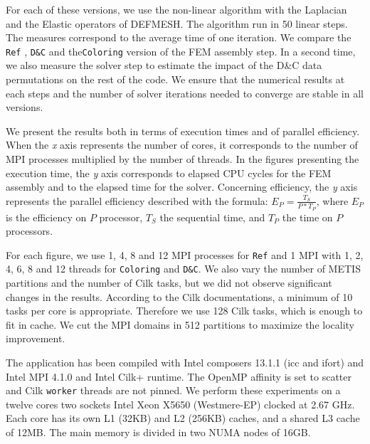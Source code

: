 \documentclass[10pt]{IOS-Book-Article}
\begin{document}
For each of these versions, we use the non-linear algorithm with the Laplacian and the Elastic operators of DEFMESH.
The algorithm run in 50 linear steps.
The measures correspond to the average time of one iteration.
We compare the  {\tt Ref} , {\tt D\&C} and the{\tt Coloring} version of the FEM assembly step.
In a second time, we also measure the solver step to estimate the impact of the D\&C data permutations on the rest of the code.
We ensure that the numerical results at each steps and the number of solver iterations needed to converge are stable in all versions.

We present the results both in terms of execution times and of parallel efficiency.
When the \emph{x} axis represents the number of cores, it corresponds to the number of MPI processes multiplied by the number of threads.
In the figures presenting the execution time, the \emph{y} axis corresponds to elapsed CPU cycles for the FEM assembly and to the elapsed time for the solver.
Concerning efficiency, the \emph{y} axis represents the parallel efficiency described with the formula:
$E_{P} = \frac{T_{S}}{P*T_{P}}$, where $E_{P}$ is the efficiency on $P$ processor, $T_{S}$ the sequential time, and $T_{P}$ the time on $P$ processors.

For each figure, we use 1, 4, 8 and 12 MPI processes for {\tt Ref} and 1 MPI with 1, 2, 4, 6, 8 and 12 threads for {\tt Coloring} and {\tt D\&C}.
We also vary the number of METIS partitions and the number of Cilk tasks, but we did not observe significant changes in the results.
According to the Cilk documentations, a minimum of 10 tasks per core is appropriate.
Therefore we use 128 Cilk tasks, which is enough to fit in cache.
We cut the MPI domains in 512 partitions to maximize the locality improvement.

The application has been compiled with Intel composers 13.1.1 (icc and ifort) and Intel MPI 4.1.0 and Intel Cilk+ runtime.
The OpenMP affinity is set to scatter and Cilk {\tt worker} threads are not pinned.
We perform these experiments on a twelve cores two sockets Intel Xeon X5650 (Westmere-EP) clocked at 2.67 GHz.
Each core has its own L1 (32KB) and L2 (256KB) caches, and a shared L3 cache of 12MB. The main memory is divided in two NUMA nodes of 16GB.
\end{document}
